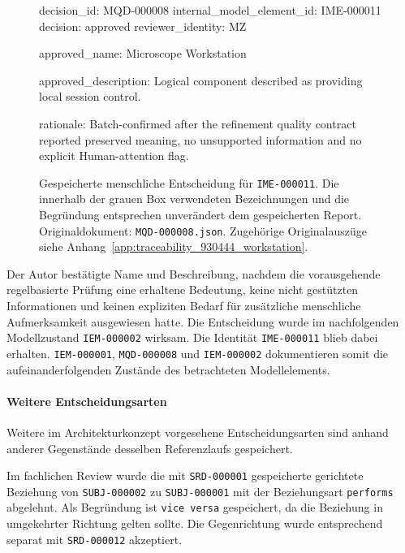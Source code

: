 \begin{figure}[htbp]
    \centering
    \begin{minipage}{0.94\textwidth}
        \begin{evidencebox}
decision_id:               MQD-000008
internal_model_element_id: IME-000011
decision:                  approved
reviewer_identity:         MZ

approved_name:
  Microscope Workstation

approved_description:
  Logical component described as providing local
  session control.

rationale:
  Batch-confirmed after the refinement quality contract
  reported preserved meaning, no unsupported information
  and no explicit Human-attention flag.
        \end{evidencebox}
    \end{minipage}
    \caption[Prüfung von Name und Beschreibung des Modellelements]{
    Gespeicherte menschliche Entscheidung für
    \texttt{IME-000011}. Die innerhalb der grauen Box verwendeten
    Bezeichnungen und die Begründung entsprechen unverändert dem
    gespeicherten Report. Originaldokument:
    \texttt{MQD-000008.json}. Zugehörige Originalauszüge siehe
    Anhang~\ref{app:traceability_930444_workstation}.}
    \label{fig:result_930444_quality}
\end{figure}

Der Autor bestätigte Name und Beschreibung, nachdem die vorausgehende
regelbasierte Prüfung eine erhaltene Bedeutung, keine nicht gestützten
Informationen und keinen expliziten Bedarf für zusätzliche menschliche
Aufmerksamkeit ausgewiesen hatte. Die Entscheidung wurde im nachfolgenden
Modellzustand \texttt{IEM-000002} wirksam. Die Identität
\texttt{IME-000011} blieb dabei erhalten. \texttt{IEM-000001},
\texttt{MQD-000008} und \texttt{IEM-000002} dokumentieren somit die
aufeinanderfolgenden Zustände des betrachteten Modellelements.

\paragraph{Weitere Entscheidungsarten}

Weitere im Architekturkonzept vorgesehene Entscheidungsarten sind anhand
anderer Gegenstände desselben Referenzlaufs gespeichert.

Im fachlichen Review wurde die mit \texttt{SRD-000001} gespeicherte
gerichtete Beziehung von \texttt{SUBJ-000002} zu
\texttt{SUBJ-000001} mit der Beziehungsart \texttt{performs} abgelehnt.
Als Begründung ist \texttt{vice versa} gespeichert, da die Beziehung in
umgekehrter Richtung gelten sollte. Die Gegenrichtung wurde entsprechend
separat mit \texttt{SRD-000012} akzeptiert.

